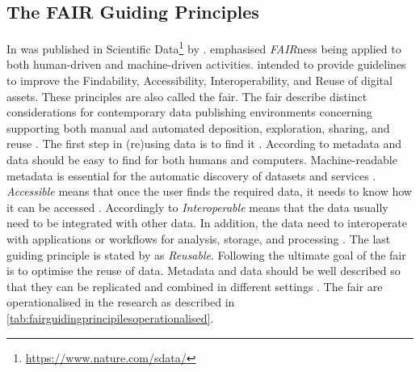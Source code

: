\subsection{The FAIR Guiding Principles}
\label{sub:fairguidingprinciples}
In \citeyear{Wilkinson2016}  was published in Scientific Data\footnote{\url{https://www.nature.com/sdata/}} by \citeauthor{Wilkinson2016}. \textcite[p.~3]{Wilkinson2016} emphasised \textit{FAIR}ness being applied to both human-driven and machine-driven activities. \textcite[Box 2]{Wilkinson2016} intended to provide guidelines to improve the Findability, Accessibility, Interoperability, and Reuse of digital assets. These principles are also called the \gls{fair}. The \gls{fair} describe distinct considerations for contemporary data publishing environments concerning supporting both manual and automated deposition, exploration, sharing, and reuse \textcite[p.~4]{Wilkinson2016}. The first step in (re)using data is to find it \parencite[p.~1]{GOFAIR2017}. According to \textcite[p.~1]{GOFAIR2017} metadata and data should be easy to find for both humans and computers. Machine-readable metadata is essential for the automatic discovery of datasets and services \parencite[p.~1]{GOFAIR2017}. \textit{Accessible} means that once the user finds the required data, it needs to know how it can be accessed \parencite[p.~1]{GOFAIR2017}. Accordingly to \textcite[p.~2]{GOFAIR2017} \textit{Interoperable} means that the data usually need to be integrated with other data. In addition, the data need to interoperate with applications or workflows for analysis, storage, and processing \parencite[p.~2]{GOFAIR2017}. The last guiding principle is stated by \textcite[p.~2]{GOFAIR2017} as \textit{Reusable}. Following \textcite[p.~2]{GOFAIR2017} the ultimate goal of the \gls{fair} is to optimise the reuse of data. Metadata and data should be well described so that they can be replicated and combined in different settings \parencite[p.~2]{GOFAIR2017}. The \gls{fair} are operationalised in the research as described in \cref{tab:fairguidingprincipilesoperationalised}.

